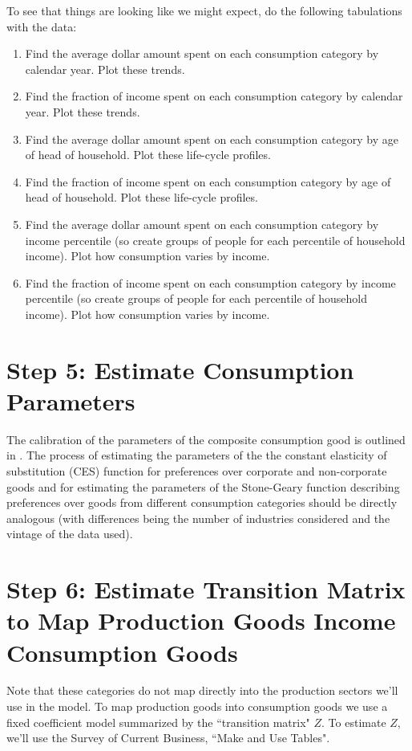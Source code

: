 \documentclass[article,11pt,letterpaper,fleqn]{article}
\theoremstyle{definition}
\numberwithin{equation}{section}
\newcommand{\cn}{\citeasnoun} %
\begin{document}
To see that things are looking like we might expect, do the following tabulations with the data:
\begin{enumerate}
\item Find the average dollar amount spent on each consumption category by calendar year.  Plot these trends.
\item Find the fraction of income spent on each consumption category by calendar year.  Plot these trends.
\item Find the average dollar amount spent on each consumption category by age of head of household.  Plot these life-cycle profiles.
\item Find the fraction of income spent on each consumption category by age of head of household.  Plot these life-cycle profiles.
\item Find the average dollar amount spent on each consumption category by income percentile (so create groups of people for each percentile of household income).  Plot how consumption varies by income.
\item Find the fraction of income spent on each consumption category by income percentile (so create groups of people for each percentile of household income).  Plot how consumption varies by income.
\end{enumerate}

\section*{Step 5: Estimate Consumption Parameters}
\label{sec:step5}

The calibration of the parameters of the composite consumption good is outlined in \cn{FR1993}.  The process of estimating the parameters of the the constant elasticity of substitution (CES) function for preferences over corporate and non-corporate goods and for estimating the parameters of the Stone-Geary function describing preferences over goods from different consumption categories should be directly analogous (with differences being the number of industries considered and the vintage of the data used).

\section*{Step 6: Estimate Transition Matrix to Map Production Goods Income Consumption Goods}
\label{sec:step6}

Note that these categories do not map directly into the production sectors we'll use in the model.  To map production goods into consumption goods we use a fixed coefficient model summarized by the ``transition matrix" $Z$.  To estimate $Z$, we'll use the Survey of Current Business, ``Make and Use Tables".
\end{document}

